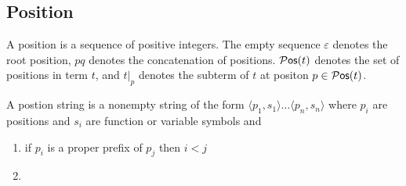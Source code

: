 \documentclass[ 
xcolor={usenames,dvipsnames,svgnames,tablem} 
,handout
]{beamer}
\begin{document}

\subsection{Position}
\begin{frame}
\begin{definition}
A position is a sequence of positive integers.
The empty sequence $\varepsilon$ denotes the root position,
$pq$ denotes the concatenation of positions. 
${}{\mathcal P}\mathsf{os}(t)$ denotes the set of positions in term $t$, and $t|_p$ denotes the subterm of $t$ at positon $p\in{}{\mathcal P}\mathsf{os}(t)$.
\end{definition}

\begin{definition}
A postion string is a nonempty string of the form $\langle p_1,s_1\rangle\ldots\langle p_n,s_n\rangle$
where $p_i$ are positions and $s_i$ are function or variable symbols and
\begin{enumerate}
\item
if $p_i$ is a proper prefix of $p_j$ then $i<j$
\item
\end{enumerate}
\end{definition}
\end{frame}


\begin{frame}
\begin{definition}

\end{definition}
\end{frame}

\end{document}
